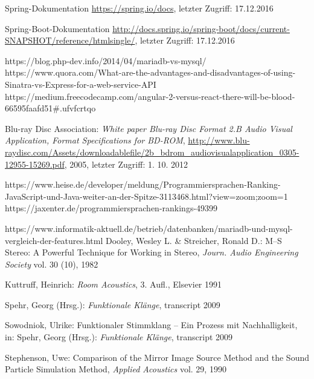 \listoffigures
\begin{thebibliography}{}


Spring-Dokumentation
\url{https://spring.io/docs}, letzter Zugriff: 17.12.2016

Spring-Boot-Dokumentation
\url{http://docs.spring.io/spring-boot/docs/current-SNAPSHOT/reference/htmlsingle/}, letzter Zugriff: 17.12.2016

https://blog.php-dev.info/2014/04/mariadb-vs-mysql/
https://www.quora.com/What-are-the-advantages-and-disadvantages-of-using-Sinatra-vs-Express-for-a-web-service-API
https://medium.freecodecamp.com/angular-2-versus-react-there-will-be-blood-66595faafd51#.ufvfcrtqo


Blu-ray Disc Association: 
\emph{White paper Blu-ray Disc Format 2.B Audio Visual Application, Format Specifications for BD-ROM}, 
\url{http://www.blu-raydisc.com/Assets/downloadablefile/2b_bdrom_audiovisualapplication_0305-12955-15269.pdf}, 2005, letzter Zugriff: 1. 10. 2012

https://www.heise.de/developer/meldung/Programmiersprachen-Ranking-JavaScript-und-Java-weiter-an-der-Spitze-3113468.html?view=zoom;zoom=1
https://jaxenter.de/programmiersprachen-rankings-49399

https://www.informatik-aktuell.de/betrieb/datenbanken/mariadb-und-mysql-vergleich-der-features.html
Dooley, Wesley L.  \& Streicher, Ronald D.:
\glqq M--S Stereo: A Powerful Technique for Working in Stereo\grqq, 
\emph{Journ. Audio Engineering Society} vol. 30 (10), 1982

Kuttruff, Heinrich: 
\emph{Room Acoustics}, 3. Aufl., Elsevier 1991

Spehr, Georg (Hrsg.): 
\emph{Funktionale Klänge}, transcript 2009

Sowodniok, Ulrike: 
\glqq Funktionaler Stimmklang -- Ein Prozess mit Nachhalligkeit\grqq, 
in: Spehr, Georg (Hrsg.): \emph{Funktionale Klänge}, transcript 2009

Stephenson, Uwe: 
\glqq Comparison of the Mirror Image Source Method and the Sound Particle Simulation Method\grqq, 
\emph{Applied Acoustics} vol. 29, 1990


\end{thebibliography}

